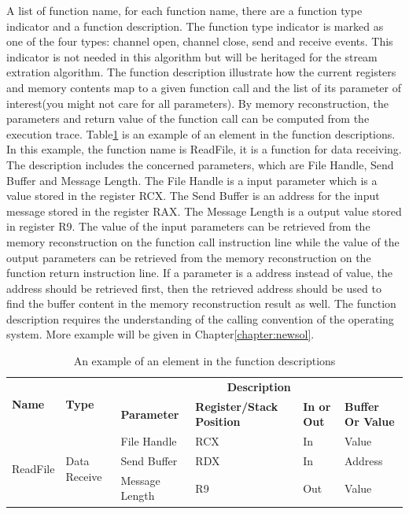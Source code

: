 A list of function name, for each function name, there are a function type indicator and a function description. The function type indicator is marked as one of the four types: channel open, channel close, send and receive events. This indicator is not needed in this algorithm but will be heritaged for the stream extration algorithm. The function description illustrate how the current registers and memory contents map to a given function call and the list of its parameter of interest(you might not care for all parameters). By memory reconstruction\cite{cleary_reconstructing_2013}, the parameters and return value of the function call can be computed from the execution trace. Table\ref{functionexample} is an example of an element in the function descriptions. In this example, the function name is ReadFile, it is a function for data receiving. The description includes the concerned parameters, which are File Handle, Send Buffer and Message Length. The File Handle is a input parameter which is a value stored in the register RCX. The Send Buffer is an address for the input message stored in the register RAX. The Message Length is a output value stored in register R9. The value of the input parameters can be retrieved from the memory reconstruction on the function call instruction line while the value of the output parameters can be retrieved from the memory reconstruction on the function return instruction line. If a parameter is a address instead of value, the address should be retrieved first, then the retrieved address should be used to find the buffer content in the memory reconstruction result as well.  The function description requires the understanding of the calling convention of the operating system. More example will be given in Chapter\ref{chapter:newsol}.

\begin{table}[H]
        \centering
        \caption{An example of an element in the function descriptions}
        \label{functionexample}
        \begin{tabular}{|l|l|l|l|l|l|}
            \hline
             \multirow{2}{*}{{\textbf{Name}}} & \multirow{2}{*}{{\textbf{Type}}} & \multicolumn{4}{c|}{\textbf{Description}}  \\
              \cline{3-6} 
             & & \textbf{Parameter}& \textbf{Register/Stack Position}& \textbf{In or Out} &  \textbf{Buffer Or Value}  \\
             \hline
             \multirow{3}{*}{ReadFile}
             &\multirow{3}{*}{Data Receive} &  File Handle & RCX & In & Value\\
              \cline{3-6} 
             & & Send Buffer & RDX & In & Address\\
              \cline{3-6} 
             & & Message Length & R9 & Out & Value\\
            \hline            
        \end{tabular}
    \end{table}

